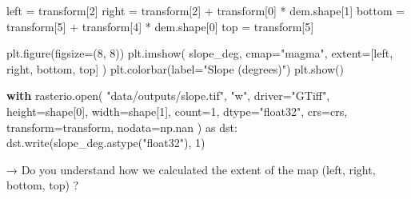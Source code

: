 \documentclass[
  letterpaper,
  DIV=11,
  numbers=noendperiod]{scrartcl}
\newenvironment{Shaded}{\begin{snugshade}}{\end{snugshade}}
\newcommand{\BuiltInTok}[1]{\textcolor[rgb]{0.00,0.23,0.31}{#1}}
\newcommand{\ControlFlowTok}[1]{\textcolor[rgb]{0.00,0.23,0.31}{\textbf{#1}}}
\newcommand{\DecValTok}[1]{\textcolor[rgb]{0.68,0.00,0.00}{#1}}
\newcommand{\ImportTok}[1]{\textcolor[rgb]{0.00,0.46,0.62}{#1}}
\newcommand{\NormalTok}[1]{\textcolor[rgb]{0.00,0.23,0.31}{#1}}
\newcommand{\OperatorTok}[1]{\textcolor[rgb]{0.37,0.37,0.37}{#1}}
\newcommand{\StringTok}[1]{\textcolor[rgb]{0.13,0.47,0.30}{#1}}
\begin{document}
\begin{Shaded}
\begin{Highlighting}[]
\NormalTok{left }\OperatorTok{=}\NormalTok{ transform[}\DecValTok{2}\NormalTok{]}
\NormalTok{right }\OperatorTok{=}\NormalTok{ transform[}\DecValTok{2}\NormalTok{] }\OperatorTok{+}\NormalTok{ transform[}\DecValTok{0}\NormalTok{] }\OperatorTok{*}\NormalTok{ dem.shape[}\DecValTok{1}\NormalTok{]}
\NormalTok{bottom }\OperatorTok{=}\NormalTok{ transform[}\DecValTok{5}\NormalTok{] }\OperatorTok{+}\NormalTok{ transform[}\DecValTok{4}\NormalTok{] }\OperatorTok{*}\NormalTok{ dem.shape[}\DecValTok{0}\NormalTok{]}
\NormalTok{top }\OperatorTok{=}\NormalTok{ transform[}\DecValTok{5}\NormalTok{]}

\NormalTok{plt.figure(figsize}\OperatorTok{=}\NormalTok{(}\DecValTok{8}\NormalTok{, }\DecValTok{8}\NormalTok{))}
\NormalTok{plt.imshow(}
\NormalTok{    slope\_deg,}
\NormalTok{    cmap}\OperatorTok{=}\StringTok{"magma"}\NormalTok{,}
\NormalTok{    extent}\OperatorTok{=}\NormalTok{[left, right, bottom, top]}
\NormalTok{)}
\NormalTok{plt.colorbar(label}\OperatorTok{=}\StringTok{"Slope (degrees)"}\NormalTok{)}
\NormalTok{plt.show()}

\ControlFlowTok{with}\NormalTok{ rasterio.}\BuiltInTok{open}\NormalTok{(}
    \StringTok{"data/outputs/slope.tif"}\NormalTok{,}
    \StringTok{"w"}\NormalTok{,}
\NormalTok{    driver}\OperatorTok{=}\StringTok{"GTiff"}\NormalTok{,}
\NormalTok{    height}\OperatorTok{=}\NormalTok{shape[}\DecValTok{0}\NormalTok{],}
\NormalTok{    width}\OperatorTok{=}\NormalTok{shape[}\DecValTok{1}\NormalTok{],}
\NormalTok{    count}\OperatorTok{=}\DecValTok{1}\NormalTok{,}
\NormalTok{    dtype}\OperatorTok{=}\StringTok{"float32"}\NormalTok{,}
\NormalTok{    crs}\OperatorTok{=}\NormalTok{crs,}
\NormalTok{    transform}\OperatorTok{=}\NormalTok{transform,}
\NormalTok{    nodata}\OperatorTok{=}\NormalTok{np.nan}
\NormalTok{) }\ImportTok{as}\NormalTok{ dst:}
\NormalTok{    dst.write(slope\_deg.astype(}\StringTok{"float32"}\NormalTok{), }\DecValTok{1}\NormalTok{)}
\end{Highlighting}
\end{Shaded}

→ Do you understand how we calculated the extent of the map (left,
right, bottom, top) ?
\end{document}
